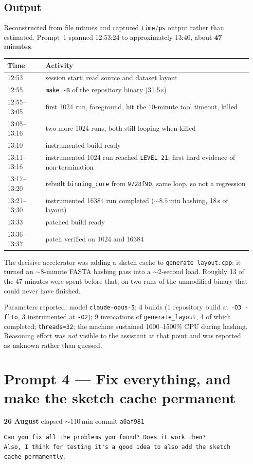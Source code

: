 \documentclass[11pt,a4paper]{article}
\newenvironment{promptbox}{\medskip}{\medskip}
\newcommand{\code}[1]{\lstinline[basicstyle=\ttfamily\small]!#1!}
\newcommand{\sha}[1]{\texttt{#1}}
\begin{document}
\subsection*{Output}

Reconstructed from file mtimes and captured \texttt{time}/\texttt{ps} output rather than estimated.
Prompt~1 spanned 12:53:24 to approximately 13:40, about \textbf{47 minutes}.

\begin{longtable}{@{}lp{11.6cm}@{}}
\toprule
\textbf{Time} & \textbf{Activity} \\
\midrule
\endhead
12:53 & session start; read source and dataset layout \\
12:55 & \texttt{make -B} of the repository binary (31.5\,s) \\
12:55--13:05 & first 1024 run, foreground, hit the 10-minute tool timeout, killed \\
13:05--13:16 & two more 1024 runs, both still looping when killed \\
13:10 & instrumented build ready \\
13:11--13:16 & instrumented 1024 run reached \texttt{LEVEL 21}; first hard evidence of non-termination \\
13:17--13:20 & rebuilt \code{binning_core} from \sha{9728f90}, same loop, so not a regression \\
13:21--13:30 & instrumented 16384 run completed (${\sim}8.5$\,min hashing, 18\,s of layout) \\
13:33 & patched build ready \\
13:36--13:37 & patch verified on 1024 and 16384 \\
\bottomrule
\end{longtable}

\noindent The decisive accelerator was adding a sketch cache to \texttt{generate\_layout.cpp}: it
turned an ${\sim}8$-minute FASTA hashing pass into a ${\sim}2$-second load. Roughly 13 of the 47
minutes were spent before that, on two runs of the unmodified binary that could never have
finished.

\medskip\noindent Parameters reported: model \texttt{claude-opus-5}; 4 builds (1 repository build
at \texttt{-O3 -flto}, 3 instrumented at \texttt{-O2}); 9 invocations of \texttt{generate\_layout},
4 of which completed; \texttt{threads=32}; the machine sustained 1000--1500\% CPU during hashing.
Reasoning effort was \emph{not} visible to the assistant at that point and was reported as unknown
rather than guessed.
\section{Prompt 4 --- Fix everything, and make the sketch cache permanent}
\textbf{26 August} \textperiodcentered{} elapsed ${\sim}$110\,min \textperiodcentered{} commit \sha{a0af981}
\begin{promptbox}
\begin{lstlisting}[style=promptstyle]
Can you fix all the problems you found? Does it work then?
Also, I think for testing it's a good idea to also add the sketch cache permamently.
\end{lstlisting}
\end{promptbox}
\end{document}
